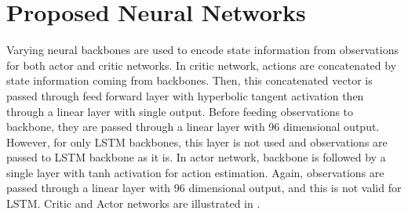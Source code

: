 \section{Proposed Neural Networks}
\label{sec:proposed_networks}

Varying neural backbones are used to encode state information from observations for both actor and critic networks. 
In critic network, actions are concatenated by state information coming from backbones. 
Then, this concatenated vector is passed through feed forward layer with hyperbolic tangent activation then through a linear layer with single output. 
Before feeding observations to backbone, they are passed through a linear layer with 96 dimensional output. 
However, for only LSTM backbones, this layer is not used and observations are passed to LSTM backbone as it is. 
In actor network, backbone is followed by a single layer with tanh activation for action estimation. 
Again, observations are passed through a linear layer with 96 dimensional output, and this is not valid for LSTM.
Critic and Actor networks are illustrated in .

